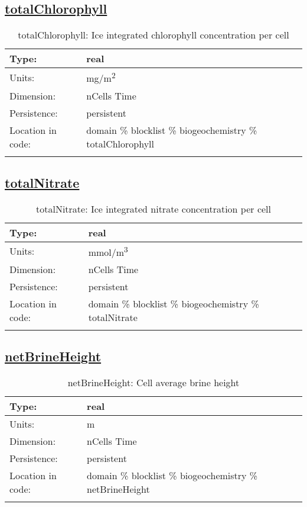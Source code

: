 \subsection[totalChlorophyll]{\hyperref[sec:var_tab_biogeochemistry]{totalChlorophyll}}
\label{subsec:var_sec_biogeochemistry_totalChlorophyll}
\begin{center}
\begin{longtable}{| p{2.0in} | p{4.0in} |}
        \hline 
        Type: & real \\
        \hline 
        Units: & \si{mg/m^2} \\
        \hline 
        Dimension: & nCells Time \\
        \hline 
        Persistence: & persistent \\
        \hline 
         Location in code: & domain \% blocklist \% biogeochemistry \% totalChlorophyll \\
         \hline 
    \caption{totalChlorophyll: Ice integrated chlorophyll concentration per cell}
\end{longtable}
\end{center}
\subsection[totalNitrate]{\hyperref[sec:var_tab_biogeochemistry]{totalNitrate}}
\label{subsec:var_sec_biogeochemistry_totalNitrate}
\begin{center}
\begin{longtable}{| p{2.0in} | p{4.0in} |}
        \hline 
        Type: & real \\
        \hline 
        Units: & \si{mmol/m^3} \\
        \hline 
        Dimension: & nCells Time \\
        \hline 
        Persistence: & persistent \\
        \hline 
         Location in code: & domain \% blocklist \% biogeochemistry \% totalNitrate \\
         \hline 
    \caption{totalNitrate: Ice integrated nitrate concentration per cell}
\end{longtable}
\end{center}
\subsection[netBrineHeight]{\hyperref[sec:var_tab_biogeochemistry]{netBrineHeight}}
\label{subsec:var_sec_biogeochemistry_netBrineHeight}
\begin{center}
\begin{longtable}{| p{2.0in} | p{4.0in} |}
        \hline 
        Type: & real \\
        \hline 
        Units: & \si{m} \\
        \hline 
        Dimension: & nCells Time \\
        \hline 
        Persistence: & persistent \\
        \hline 
         Location in code: & domain \% blocklist \% biogeochemistry \% netBrineHeight \\
         \hline 
    \caption{netBrineHeight: Cell average brine height}
\end{longtable}
\end{center}
